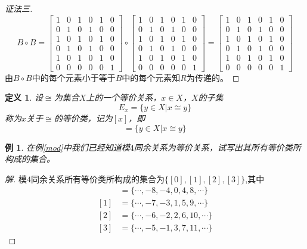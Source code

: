 \documentclass{book}[oneside]
\newtheorem{Def}{定义}[chapter]
\newtheorem{Example}{例}[chapter]
\begin{document}
\begin{CJK*}{UTF8}{gbsn}
\begin{proof}[证法三]
      \[B\circ B=\begin{bmatrix}
          1&0&1&0&1&0\\
          0&1&0&1&0&0\\
          1&0&1&0&1&0\\
          0&1&0&1&0&0\\
          1&0&1&0&1&0\\
          0&0&0&0&0&1
        \end{bmatrix}\circ\begin{bmatrix}
          1&0&1&0&1&0\\
          0&1&0&1&0&0\\
          1&0&1&0&1&0\\
          0&1&0&1&0&0\\
          1&0&1&0&1&0\\
          0&0&0&0&0&1
        \end{bmatrix}=\begin{bmatrix}
          1&0&1&0&1&0\\
          0&1&0&1&0&0\\
          1&0&1&0&1&0\\
          0&1&0&1&0&0\\
          1&0&1&0&1&0\\
          0&0&0&0&0&1
        \end{bmatrix}
      \]
      由$B\circ B$中的每个元素小于等于$B$中的每个元素知$R$为传递的。
    \end{proof}
  \begin{Def}
    设$\cong$为集合$X$上的一个等价关系，$x\in X$，$X$的子集
    \[E_x=\{y\in X | x \cong y\}\]称为$x$关于$\cong$的等价类，记为$[x]$，即
    \begin{equation*}
      [x] = \{y \in X | x \cong y\}
    \end{equation*}
  \end{Def}
  \begin{Example}
    在例\ref{mod}中我们已经知道模$4$同余关系为等价关系，试写出其所有等价类所构成的集合。
  \end{Example}
  \begin{proof}[解]
    模$4$同余关系所有等价类所构成的集合为$\{[0],[1],[2],[3]\}$,其中
    \begin{align*}
      [0]&=\{\cdots,-8,-4,0,4,8,\cdots\}\\
      [1]&=\{\cdots,-7,-3,1,5,9,\cdots\}\\
      [2]&=\{\cdots,-6,-2,2,6,10,\cdots\}\\
      [3]&=\{\cdots,-5,-1,3,7,11,\cdots\}

\end{align*}
\end{proof}
\end{CJK*}
\end{document}
